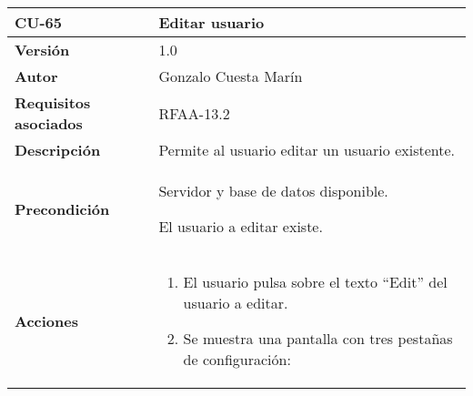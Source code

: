 \begin{longtable}[]{@{}ll@{}}
\toprule
\begin{minipage}[b]{0.21\columnwidth}\raggedright
\textbf{CU-65}\strut
\end{minipage} & \begin{minipage}[b]{0.73\columnwidth}\raggedright
\textbf{Editar usuario}\strut
\end{minipage}\tabularnewline
\midrule
\endhead
\begin{minipage}[t]{0.21\columnwidth}\raggedright
\textbf{Versión}\strut
\end{minipage} & \begin{minipage}[t]{0.73\columnwidth}\raggedright
1.0\strut
\end{minipage}\tabularnewline
\begin{minipage}[t]{0.21\columnwidth}\raggedright
\textbf{Autor}\strut
\end{minipage} & \begin{minipage}[t]{0.73\columnwidth}\raggedright
Gonzalo Cuesta Marín\strut
\end{minipage}\tabularnewline
\begin{minipage}[t]{0.21\columnwidth}\raggedright
\textbf{Requisitos asociados}\strut
\end{minipage} & \begin{minipage}[t]{0.73\columnwidth}\raggedright
RFAA-13.2\strut
\end{minipage}\tabularnewline
\begin{minipage}[t]{0.21\columnwidth}\raggedright
\textbf{Descripción}\strut
\end{minipage} & \begin{minipage}[t]{0.73\columnwidth}\raggedright
Permite al usuario editar un usuario existente.\strut
\end{minipage}\tabularnewline
\begin{minipage}[t]{0.21\columnwidth}\raggedright
\textbf{Precondición}\strut
\end{minipage} & \begin{minipage}[t]{0.73\columnwidth}\raggedright
Servidor y base de datos disponible.

El usuario a editar existe.\strut
\end{minipage}\tabularnewline
\begin{minipage}[t]{0.21\columnwidth}\raggedright
\textbf{Acciones}\strut
\end{minipage} & \begin{minipage}[t]{0.73\columnwidth}\raggedright
\begin{enumerate}
\def\labelenumi{\arabic{enumi}.}
\tightlist
\item
  El usuario pulsa sobre el texto ``Edit'' del usuario a editar.
\item
  Se muestra una pantalla con tres pestañas de configuración:


\end{enumerate}
\end{minipage}
\end{longtable}
